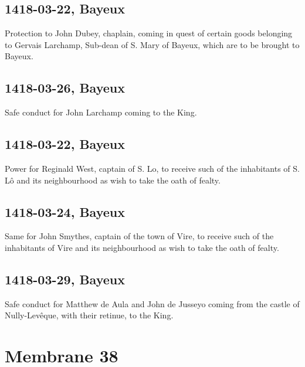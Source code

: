 \documentclass[a4paper,12pt,twoside]{book}
\begin{document}
            \subsection{1418-03-22, Bayeux}
            
                     Protection to John Dubey, chaplain, coming in quest of certain goods belonging to Gervais Larchamp, Sub-dean of S. Mary of Bayeux, which are to be brought to Bayeux.
                  
            \subsection{1418-03-26, Bayeux}
            
                     Safe conduct for John Larchamp coming to the King.
                  
            \subsection{1418-03-22, Bayeux}
            
                     Power for Reginald West, captain of S. Lo, to receive such of the inhabitants of S. Lô and its neighbourhood as wish to take the oath of fealty.
                  
            \subsection{1418-03-24, Bayeux}
            
                     Same for John Smythes, captain of the town of Vire, to receive such of the inhabitants of Vire and its neighbourhood as wish to take the oath of fealty.
                  
            \subsection{1418-03-29, Bayeux}
            
                     Safe conduct for Matthew de Aula and John de Jusseyo coming from the castle of Nully-Levêque, with their retinue, to the King.
                  
            \newpage
        
        \section{Membrane 38}
        
\end{document}
